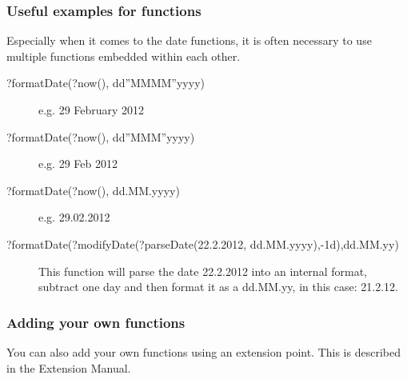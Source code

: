 \subsubsection{Useful examples for functions}
Especially when it comes to the date functions, it is often necessary to use multiple functions embedded within each other. 
\begin{description}
\item [?formatDate(?now(), dd''MMMM''yyyy)]{e.g. 29 February 2012}
\item [?formatDate(?now(), dd''MMM''yyyy)]{e.g. 29 Feb 2012}
\item [?formatDate(?now(), dd.MM.yyyy)]{e.g. 29.02.2012}
\item [?formatDate(?modifyDate(?parseDate(22.2.2012, dd.MM.yyyy),-1d),dd.MM.yy)]{This function will parse the date 22.2.2012 into an internal format, subtract one day and then format it as a dd.MM.yy, in this case: 21.2.12.}
\end{description}

\subsubsection{Adding your own functions}
You can also add your own functions using an extension point. This is described in the Extension Manual. 




